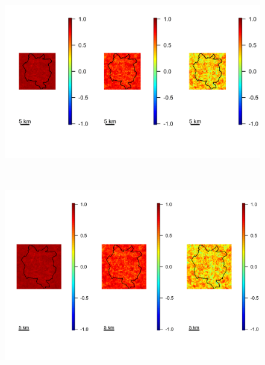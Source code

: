 \begin{appendices}
    \begin{figure}[H]
        \begin{center}
            \includegraphics[width = \linewidth, height = 80mm]{Autocorrelations in the Latent Field - Major 2.png}
        \end{center}
    \end{figure}

    \begin{figure}[H]
        \begin{center}
            \includegraphics[width = \linewidth, height = 80mm]{Autocorrelations in the Latent Field - Major 13456.png}
        \end{center}
    \end{figure}


\end{appendices}
